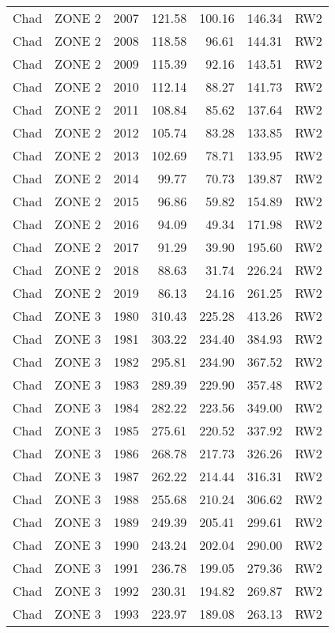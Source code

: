 \begin{longtable}{lllrrrl}
  Chad & ZONE 2 & 2007 & 121.58 & 100.16 & 146.34 & RW2 \\ 
  Chad & ZONE 2 & 2008 & 118.58 & 96.61 & 144.31 & RW2 \\ 
  Chad & ZONE 2 & 2009 & 115.39 & 92.16 & 143.51 & RW2 \\ 
  Chad & ZONE 2 & 2010 & 112.14 & 88.27 & 141.73 & RW2 \\ 
  Chad & ZONE 2 & 2011 & 108.84 & 85.62 & 137.64 & RW2 \\ 
  Chad & ZONE 2 & 2012 & 105.74 & 83.28 & 133.85 & RW2 \\ 
  Chad & ZONE 2 & 2013 & 102.69 & 78.71 & 133.95 & RW2 \\ 
  Chad & ZONE 2 & 2014 & 99.77 & 70.73 & 139.87 & RW2 \\ 
  Chad & ZONE 2 & 2015 & 96.86 & 59.82 & 154.89 & RW2 \\ 
  Chad & ZONE 2 & 2016 & 94.09 & 49.34 & 171.98 & RW2 \\ 
  Chad & ZONE 2 & 2017 & 91.29 & 39.90 & 195.60 & RW2 \\ 
  Chad & ZONE 2 & 2018 & 88.63 & 31.74 & 226.24 & RW2 \\ 
  Chad & ZONE 2 & 2019 & 86.13 & 24.16 & 261.25 & RW2 \\ 
  Chad & ZONE 3 & 1980 & 310.43 & 225.28 & 413.26 & RW2 \\ 
  Chad & ZONE 3 & 1981 & 303.22 & 234.40 & 384.93 & RW2 \\ 
  Chad & ZONE 3 & 1982 & 295.81 & 234.90 & 367.52 & RW2 \\ 
  Chad & ZONE 3 & 1983 & 289.39 & 229.90 & 357.48 & RW2 \\ 
  Chad & ZONE 3 & 1984 & 282.22 & 223.56 & 349.00 & RW2 \\ 
  Chad & ZONE 3 & 1985 & 275.61 & 220.52 & 337.92 & RW2 \\ 
  Chad & ZONE 3 & 1986 & 268.78 & 217.73 & 326.26 & RW2 \\ 
  Chad & ZONE 3 & 1987 & 262.22 & 214.44 & 316.31 & RW2 \\ 
  Chad & ZONE 3 & 1988 & 255.68 & 210.24 & 306.62 & RW2 \\ 
  Chad & ZONE 3 & 1989 & 249.39 & 205.41 & 299.61 & RW2 \\ 
  Chad & ZONE 3 & 1990 & 243.24 & 202.04 & 290.00 & RW2 \\ 
  Chad & ZONE 3 & 1991 & 236.78 & 199.05 & 279.36 & RW2 \\ 
  Chad & ZONE 3 & 1992 & 230.31 & 194.82 & 269.87 & RW2 \\ 
  Chad & ZONE 3 & 1993 & 223.97 & 189.08 & 263.13 & RW2 \\ 

\end{longtable}
